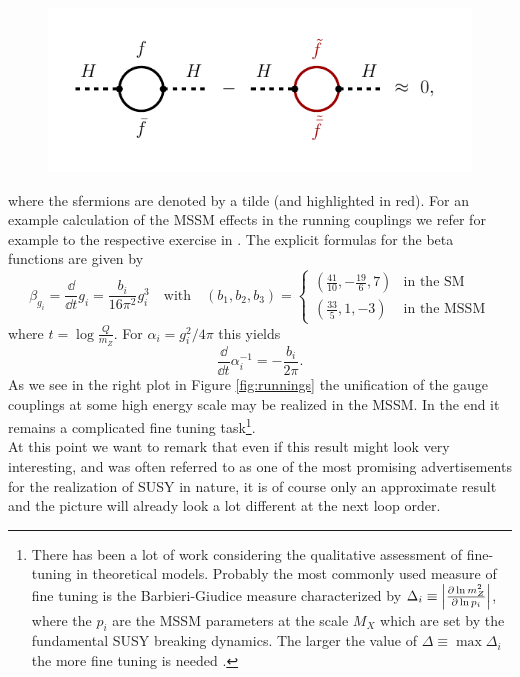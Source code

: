\begin{figure}[H]
\centering
\includegraphics[scale = 0.9]{figures/running_diagrams}
\end{figure}
\noindent
where the sfermions are denoted by a tilde (and highlighted in red). For an example calculation of the MSSM effects in the running couplings we refer for example to the respective exercise in \cite{Hebecker2020}.  \newpage The explicit formulas for the beta functions are given by
\begin{equation}
	\beta_{g_i} = \frac{\dd}{\dd t}g_i = \frac{b_i}{16\pi^2} g_i^3 \quad \text{with} \quad (b_1,b_2,b_3) = \left\{\begin{array}{ll}{(\frac{41}{10}, -\frac{19}{6}, 7)} & {\text {in the SM} } \\ {(\frac{33}{5}, 1, -3)} & {\text {in the MSSM}} \end{array}\right. 
\end{equation}
where $t = \log\frac{Q}{m_Z}$. For $\alpha_i = g_i^2/4\pi$ this yields 
\begin{equation}
	\frac{\dd }{\dd t} \alpha_i^{-1} = -\frac{b_i}{2\pi}.
\end{equation}
As we see in the right plot in Figure \ref{fig:runnings} the unification of the gauge couplings at some high energy scale may be realized in the MSSM. In the end it remains a complicated fine tuning task\footnote{There has been a lot of work considering the qualitative assessment of fine-tuning in theoretical models. Probably the most commonly used measure of fine tuning is the Barbieri-Giudice measure characterized by $\Delta_i \equiv \abs{\frac{\partial \operatorname{ln} m_Z^2}{\partial \operatorname{ln} p_i}}$, where the $p_i$ are the MSSM parameters at the scale $M_X$ which are set by the fundamental SUSY breaking dynamics. The larger the value of $\Delta \equiv \operatorname{max} \Delta_i$ the more fine tuning is needed  \cite{PDG20182019, Hebecker2020}.}. \\
At this point we want to remark that even if this result might look very interesting, and was often referred to as one of the most promising advertisements for the realization of SUSY in nature, it is of course only an approximate result and the picture will already look a lot different at the next loop order.

